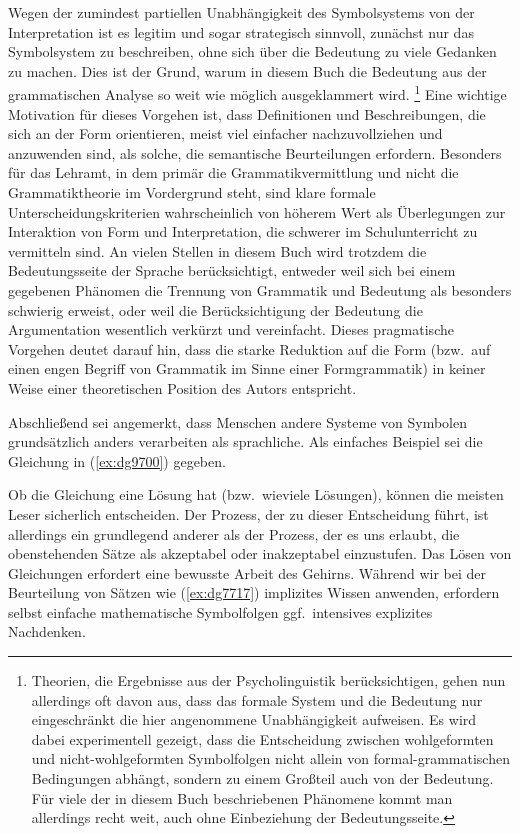 Wegen der zumindest partiellen Unabhängigkeit des Symbolsystems von der Interpretation ist es legitim und sogar strategisch sinnvoll, zunächst nur das Symbolsystem zu beschreiben, ohne sich über die Bedeutung zu viele Gedanken zu machen.
Dies ist der Grund, warum in diesem Buch die Bedeutung aus der grammatischen Analyse so weit wie möglich ausgeklammert wird.%
\footnote{
Theorien, die Ergebnisse aus der Psycholinguistik berücksichtigen, gehen nun allerdings oft davon aus, dass das formale System und die Bedeutung nur eingeschränkt die hier angenommene Unabhängigkeit aufweisen.
Es wird dabei \zB experimentell gezeigt, dass die Entscheidung zwischen wohlgeformten und nicht-wohlgeformten Symbolfolgen nicht allein von formal-grammatischen Bedingungen abhängt, sondern zu einem Großteil auch von der Bedeutung.
Für viele der in diesem Buch beschriebenen Phänomene kommt man allerdings recht weit, auch ohne Einbeziehung der Bedeutungsseite.}
Eine wichtige Motivation für dieses Vorgehen ist, dass Definitionen und Beschreibungen, die sich an der Form orientieren, meist viel einfacher nachzuvollziehen und anzuwenden sind, als solche, die semantische Beurteilungen erfordern.
Besonders für das Lehramt, in dem primär die Grammatikvermittlung und nicht die Grammatiktheorie im Vordergrund steht, sind klare formale Unterscheidungskriterien wahrscheinlich von höherem Wert als Überlegungen zur Interaktion von Form und Interpretation, die schwerer im Schulunterricht zu vermitteln sind.
An vielen Stellen in diesem Buch wird trotzdem die Bedeutungsseite der Sprache berücksichtigt, entweder weil sich bei einem gegebenen Phänomen die Trennung von Grammatik und Bedeutung als besonders schwierig erweist, oder weil die Berücksichtigung der Bedeutung die Argumentation wesentlich verkürzt und vereinfacht.
Dieses pragmatische Vorgehen deutet darauf hin, dass die starke Reduktion auf die Form (bzw.\ auf einen engen Begriff von Grammatik im Sinne einer Formgrammatik) in keiner Weise einer theoretischen Position des Autors entspricht.

Abschließend sei angemerkt, dass Menschen andere Systeme von Symbolen grundsätzlich anders verarbeiten als sprachliche.
Als einfaches Beispiel sei die Gleichung in (\ref{ex:dg9700}) gegeben.

\begin{exe}
\end{exe}

Ob die Gleichung eine Lösung hat (bzw.\ wieviele Lösungen), können die meisten Leser sicherlich entscheiden.
Der Prozess, der zu dieser Entscheidung führt, ist allerdings ein grundlegend anderer als der Prozess, der es uns erlaubt, die obenstehenden Sätze als akzeptabel oder inakzeptabel einzustufen.
Das Lösen von Gleichungen erfordert eine bewusste Arbeit des Gehirns.
Während wir bei der Beurteilung von Sätzen wie (\ref{ex:dg7717}) implizites Wissen anwenden, erfordern selbst einfache mathematische Symbolfolgen ggf.\ intensives explizites Nachdenken.

